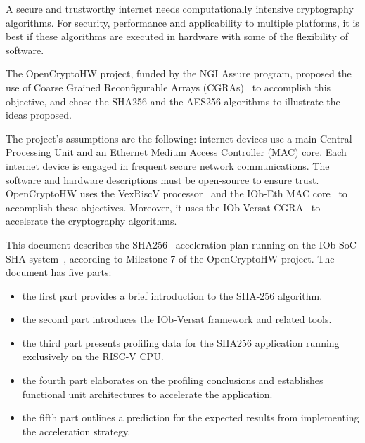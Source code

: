 A secure and trustworthy internet needs computationally intensive cryptography
algorithms. For security, performance and applicability to multiple platforms,
it is best if these algorithms are executed in hardware with some of the
flexibility of software.

The OpenCryptoHW project, funded by the NGI Assure program, proposed the use of
Coarse Grained Reconfigurable Arrays (CGRAs)~\cite{CGRA:Overview} to accomplish
this objective, and chose the SHA256 and the AES256 algorithms to illustrate
the ideas proposed.

The project's assumptions are the following: internet devices use a main
Central Processing Unit and an Ethernet Medium Access Controller (MAC) core.
Each internet device is engaged in frequent secure network communications. The
software and hardware descriptions must be open-source to ensure trust. 
OpenCryptoHW uses the VexRiscV processor~\cite{VexRiscv} and the IOb-Eth MAC
core~\cite{iob-eth} to accomplish these objectives. Moreover, it uses the
IOb-Versat CGRA~\cite{iob-versat} to accelerate the cryptography algorithms.

This document describes the SHA256~\cite{SHA_NIST_FIPS} acceleration plan
running on the IOb-SoC-SHA system~\cite{iob-soc-sha}, according to Milestone 7
of the OpenCryptoHW project. The document has five parts:
\begin{itemize}
\item the first part provides a brief introduction to the SHA-256 algorithm.
\item the second part introduces the IOb-Versat framework and related tools.
\item the third part presents profiling data for the SHA256 application
    running exclusively on the RISC-V CPU.
\item the fourth part elaborates on the profiling conclusions and establishes
    functional unit architectures to accelerate the application.
\item the fifth part outlines a prediction for the expected results from
    implementing the acceleration strategy.
\end{itemize}










